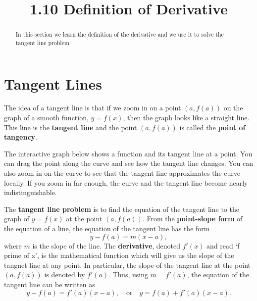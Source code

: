 \documentclass{ximera}
\title{1.10 Definition of Derivative}
\begin{document}
\begin{abstract}
In this section we learn the definition of the derivative and we use it to solve the tangent line problem.
\end{abstract}

\maketitle


\section{Tangent Lines}










The idea of a tangent line is that if we zoom in on a point $(a, f(a))$ on the graph of a smooth function, $y = f(x)$, 
then the graph looks like a straight line. 
This line is the \textbf{tangent line} and the point $(a, f(a))$ is called the \textbf{point of tangency}.



The interactive graph below shows a function and its tangent line at a point.  
You can drag the point along the curve and see how the tangent line changes.
You can also zoom in on the curve to see that the tangent line approximates the curve
locally.  If you zoom in far enough, the curve and the tangent line become nearly indistinguishable.









The \textbf{tangent line problem} is to find the equation of the tangent line to the graph of $y = f(x)$
at the point $(a, f(a))$. From the \textbf{point-slope form} of the equation of a line,
the equation of the tangent line has the form
\[
y -f(a) = m(x-a),
\]
where $m$ is the slope of the line.  The \textbf{derivative}, denoted $f'(x)$ and read `f prime of x', is the mathematical 
function which will give us the slope of the tangnet line at any point.  
In particular, the slope of the tangent line at the point $(a, f(a))$ is denoted by $f'(a)$.
Thus, using $m = f'(a)$, the equation of the tangent line can be written as
\[
y - f(a) = f'(a)(x-a), \quad \text{or} \quad y = f(a) + f'(a)(x-a).
\]
\end{document}

